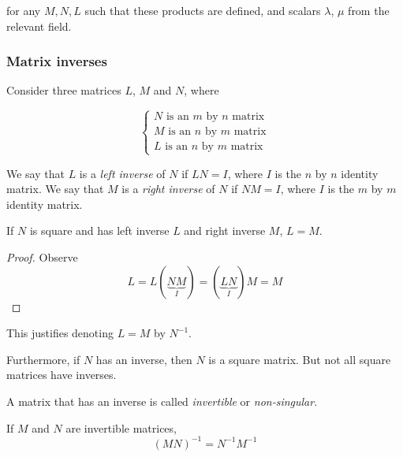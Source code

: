 \documentclass{../template/note}
\begin{document}
    for any \(M, N, L\) such that these products are defined, and scalars \(\lambda\), \(\mu\) from the relevant field.

    \subsubsection{Matrix inverses}

    Consider three matrices \(L\), \(M\) and \(N\), where

    \[
        \begin{cases}
            N \text{ is an } m \text{ by } n \text{ matrix} \\
            M \text{ is an } n \text{ by } m \text{ matrix} \\
            L \text{ is an } n \text{ by } m \text{ matrix}
        \end{cases}
    \]
    
    \begin{definition}
        We say that \(L\) is a \emph{left inverse} of \(N\) if \(LN = I\), where \(I\) is the \(n\) by \(n\) identity matrix. We say that \(M\) is a \emph{right inverse} of \(N\) if \(NM = I\), where \(I\) is the \(m\) by \(m\) identity matrix.
    \end{definition}
    
    \begin{proposition}
        If \(N\) is square and has left inverse \(L\) and right inverse \(M\), \(L = M\).
    \end{proposition}
    
    \begin{proof}
        Observe
        \[
            L = L(\underbrace{NM}_I) = (\underbrace{LN}_I)M = M
        \]
    \end{proof}
    This justifies denoting \(L = M\) by \(N^{-1}\).

    \begin{remark}
        Furthermore, if \(N\) has an inverse, then \(N\) is a square matrix. But not all square matrices have inverses.
    \end{remark}
    
    \begin{definition}
        A matrix that has an inverse is called \emph{invertible} or \emph{non-singular}.
    \end{definition}
    
    \begin{proposition}
        If \(M\) and \(N\) are invertible matrices,
        \[
            (MN)^{-1} = N^{-1}M^{-1}
        \]
    \end{proposition}
    
\end{document}

